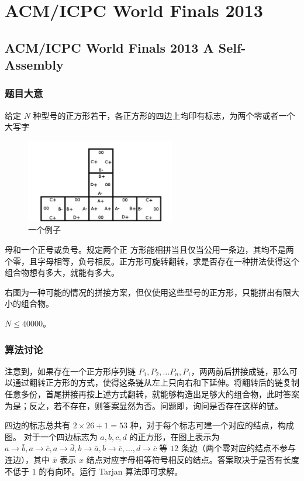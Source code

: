 
	\section{ACM/ICPC World Finals 2013}
		\subsection{ACM/ICPC World Finals 2013 A Self-Assembly}
			\subsubsection{题目大意}
				
				
				给定 $N$ 种型号的正方形若干，各正方形的四边上均印有标志，为两个零或者一个大写字
				\begin{figure}
 					\centering
					\includegraphics[width= 6.5cm]{1.jpg}
					\caption{一个例子}
				\end{figure}
				母和一个正号或负号。规定两个正
				方形能相拼当且仅当公用一条边，其均不是两个零，且字母相等，负号相反。正方形可旋转翻转，求是否存在一种拼法使得这个组合物想有多大，就能有多大。
				
				右图为一种可能的情况的拼接方案，但仅使用这些型号的正方形，只能拼出有限大小的组合物。
				
				$N \le \num{40000}$。
			
			\subsubsection{算法讨论}
				注意到，如果存在一个正方形序列链 $P_1, P_2, \ldots P_n, P_1$，两两前后拼接成链，那么可以通过翻转正方形的方式，使得这条链从左上只向右和下延伸。将翻转后的链复制任意多份，首尾拼接再按上述方式翻转，就能够构造出足够大的组合物，此时答案为是；反之，若不存在，则答案显然为否。问题即，询问是否存在这样的链。
				
				四边的标志总共有 $2 \times 26 + 1 = 53$ 种，对于每个标志可建一个对应的结点，构成图。
				对于一个四边标志为 $a,b,c,d$ 的正方形，在图上表示为 $a \rightarrow \bar{b}, a \rightarrow \bar{c}, a \rightarrow \bar{d}, b \rightarrow \bar{a}, b \rightarrow \bar{c}, \ldots, d \rightarrow \bar{c}  $ 等 $12$ 条边（两个零对应的结点不参与连边），其中 $\bar{x}$ 表示 $x$ 结点对应字母相等符号相反的结点。答案取决于是否有长度不低于 $1$ 的有向环。运行 Tarjan 算法即可求解。
